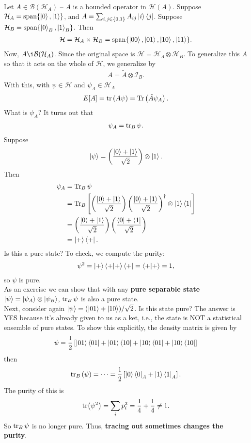 \documentclass{book}
\theoremstyle{definition}
\newcommand{\nn}{\nonumber}
\newcommand{\had}{\mathcal{H}}
\newcommand{\f}[2]{\frac{#1}{#2}}
\newcommand{\lp}{\left(}
\newcommand{\rp}{\right)}
\newcommand{\lb}{\left[}
\newcommand{\rb}{\right]}
\newcommand{\Id}{\mathcal{I}}
\begin{document}
Let $A \in \mathcal{B}(\had_A)$ -- $A$ is a bounded operator in $\had(A)$. Suppose $\had_{A} = \text{span}\{ \ket{0},\ket{1}  \}$, and $A = \sum_{i,j\in \{0,1\}}A_{ij}\ket{i}\bra{j}$. Suppose $\had_B = \text{span}\{ \ket{0}_B,\ket{1}_B \}$. Then
\begin{align}
\had = \had_A \times \had_B = \text{span}\{ \ket{00}, \ket{01}, \ket{10}, \ket{11}   \}.
\end{align}
Now, $A \i \mathcal{B}(\had_A)$. Since the original space is $\had = \had_A \otimes \had_B$. To generalize this $A$ so that it acts on the whole of $\had$, we generalize by
\begin{align}
A = \tilde{A} \otimes \Id_B.
\end{align}
With this, with $\psi \in \had$ and $\psi_A \in \had_A$
\begin{align}
E[A] = \tr\lp A \psi \rp = \Tr\lp \tilde{A} \psi_A \rp.
\end{align}
What is $\psi_A$? It turns out that
\begin{align}
\psi_A = \tr_B \psi.
\end{align}
Suppose 
\begin{align}
\ket{\psi} = \lp \f{\ket{0} + \ket{1}}{\sqrt{2}} \rp \otimes \ket{1}.
\end{align}
Then 
\begin{align}
\psi_A &= \Tr_B\psi \nn\\
&= \Tr_B \lb  \lp \f{\ket{0} + \ket{1}}{\sqrt{2}} \rp  \lp \f{\ket{0} + \ket{1}}{\sqrt{2}} \rp^\dagger   \otimes \ket{1}\bra{1} \rb \nn\\
&= \lp \f{\ket{0} + \ket{1}}{\sqrt{2}} \rp    \lp  \f{\bra{0} + \bra{1}}{\sqrt{2}} \rp\nn\\
&= \ket{+}\bra{+}.
\end{align}
Is this a pure state? To check, we compute the purity:
\begin{align}
\psi^2= \ket{+}\bra{+}\ket{+}\bra{+} = \braket{+} = 1,
\end{align}
so $\psi$ is pure. \\

As an exercise we can show that with any \textbf{pure separable state} $\ket{\psi} = \ket{\psi_A}\otimes \ket{\psi_B}$, $\tr_B\psi$ is also a pure state. \\


Next, consider again  $\ket{\psi} = (\ket{01} + \ket{10})/\sqrt{2}$. Is this state pure? The answer is YES because it's already given to us as a ket, i.e., the state is NOT a statistical ensemble of pure states. To show this explicitly, the density matrix is given by
\begin{align}
\psi = \f{1}{2}\lb \ket{01}\bra{01} + \ket{01}\bra{10} + \ket{10}\bra{01} + \ket{10}\bra{10} \rb
\end{align}
then 
\begin{align}
\tr_B\lp \psi \rp = \dots = \f{1}{2}\lb \ket{0}\bra{0}_A + \ket{1}\bra{1}_A \rb.
\end{align}
The purity of this is 
\begin{align}
\tr(\psi^2) = \sum_i p_i^2 = \f{1}{4} + \f{1}{4} \neq 1.
\end{align}
So $\tr_B\psi$ is no longer pure. Thus, \textbf{tracing out sometimes changes the purity}. 
\end{document}
